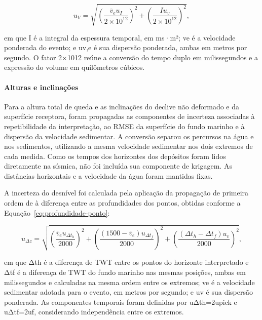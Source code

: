 \begin{equation}
  u_V=\sqrt{\left(\frac{\overline{v}_e u_I}{2\times10^{12}}\right)^2+\left(\frac{Iu_v}{2\times10^{12}}\right)^2},
  \label{eq:incerteza-volume}
\end{equation}

\noindent
em que I é a integral da espessura temporal, em ms·m²; ve é a velocidade ponderada do evento; e uv,e é sua dispersão ponderada, ambas em metros por segundo. O fator 2×1012 reúne a conversão do tempo duplo em milissegundos e a expressão do volume em quilômetros cúbicos.

\paragraph{Alturas e inclinações}

Para a altura total de queda e as inclinações do declive não deformado e da superfície receptora, foram propagadas as componentes de incerteza associadas à repetibilidade da interpretação, ao RMSE da superfície do fundo marinho e à dispersão da velocidade sedimentar. A conversão separou os percursos na água e nos sedimentos, utilizando a mesma velocidade sedimentar nos dois extremos de cada medida. Como os tempos dos horizontes dos depósitos foram lidos diretamente na sísmica, não foi incluída sua componente de krigagem. As distâncias horizontais e a velocidade da água foram mantidas fixas.

A incerteza do desnível foi calculada pela aplicação da propagação de primeira ordem de  à diferença entre as profundidades dos pontos, obtidas conforme a Equação~\eqref{eq:profundidade-ponto}:

\begin{equation}
  u_{\Delta z}=\sqrt{\left(\frac{\overline{v}_e u_{\Delta t_h}}{2000}\right)^2+\left(\frac{(1500-\overline{v}_e)u_{\Delta t_f}}{2000}\right)^2+\left(\frac{(\Delta t_h-\Delta t_f)u_v}{2000}\right)^2},
  \label{eq:incerteza-desnivel}
\end{equation}

\noindent
em que Δth é a diferença de TWT entre os pontos do horizonte interpretado e Δtf é a diferença de TWT do fundo marinho nas mesmas posições, ambas em milissegundos e calculadas na mesma ordem entre os extremos; ve é a velocidade sedimentar adotada para o evento, em metros por segundo; e uv é sua dispersão ponderada. As componentes temporais foram definidas por uΔth=2upick e uΔtf=2uf, considerando independência entre os extremos.

